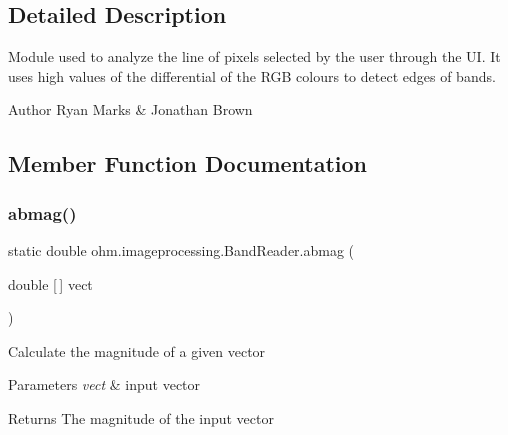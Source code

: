\subsection{Detailed Description}
Module used to analyze the line of pixels selected by the user through the UI. It uses high values of the differential of the R\+GB colours to detect edges of bands. 

\begin{DoxyAuthor}{Author}
Ryan Marks \& Jonathan Brown 
\end{DoxyAuthor}


\subsection{Member Function Documentation}
\hypertarget{classohm_1_1imageprocessing_1_1_band_reader_a89a1ca359c7d26536f149c4dcc38cc99}{}\label{classohm_1_1imageprocessing_1_1_band_reader_a89a1ca359c7d26536f149c4dcc38cc99} 
\subsubsection{\texorpdfstring{abmag()}{abmag()}}
{\footnotesize\ttfamily static double ohm.\+imageprocessing.\+Band\+Reader.\+abmag (\begin{DoxyParamCaption}\item[{double \mbox{[}$\,$\mbox{]}}]{vect }\end{DoxyParamCaption})\hspace{0.3cm}{\ttfamily [static]}}

Calculate the magnitude of a given vector 
\begin{DoxyParams}{Parameters}
{\em vect} & input vector \\
\hline
\end{DoxyParams}
\begin{DoxyReturn}{Returns}
The magnitude of the input vector 
\end{DoxyReturn}
\hypertarget{classohm_1_1imageprocessing_1_1_band_reader_a70bbf2127dd344ecbaf8190526f65d8c}{}\label{classohm_1_1imageprocessing_1_1_band_reader_a70bbf2127dd344ecbaf8190526f65d8c} 
